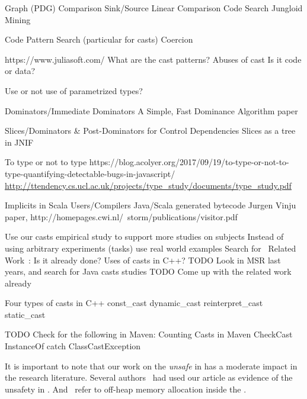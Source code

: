 Graph (PDG) Comparison
Sink/Source
Linear Comparison
Code Search
Jungloid Mining

Code Pattern Search (particular for casts)
Coercion

https://www.juliasoft.com/
What are the cast patterns?
Abuses of cast
Is it code or data?

Use or not use of parametrized types?

Dominators/Immediate Dominators
A Simple, Fast Dominance Algorithm paper



Slices/Dominators \& Post-Dominators for Control Dependencies
Slices as a tree in JNIF

To type or not to type
https://blog.acolyer.org/2017/09/19/to-type-or-not-to-type-quantifying-detectable-bugs-in-javascript/
\url{http://ttendency.cs.ucl.ac.uk/projects/type_study/documents/type_study.pdf}

Implicits in Scala
Users/Compilers Java/Scala generated bytecode
Jurgen Vinju paper, http://homepages.cwi.nl/~storm/publications/visitor.pdf

Use our casts empirical study to support more studies on subjects
Instead of using arbitrary experiments (tasks) use real world examples
Search for ~Related Work~: Is it already done?
Uses of casts in C++?
TODO Look in MSR last years, and search for Java casts studies 
TODO Come up with the related work already

Four types of casts in C++
const\_cast
dynamic\_cast
reinterpret\_cast
static\_cast

TODO Check for the following in Maven:
Counting Casts in Maven
CheckCast
InstanceOf
catch ClassCastException


It is important to note that our work on the \emph{unsafe} \api{} in \java{} has a moderate impact in the research literature.
Several authors~
\cite{staicu_understanding_2017,jiang_unsupervised_2017,zhang_accepting_2016,saied_cooperative_2016,hora_when_2016,li_accessing_2016,holzinger_-depth_2016} had used our article as evidence of the unsafety in \java{}.
And~\cite{bruno_ng2c:_2017} refer to off-heap memory allocation inside the \jvm{}.
